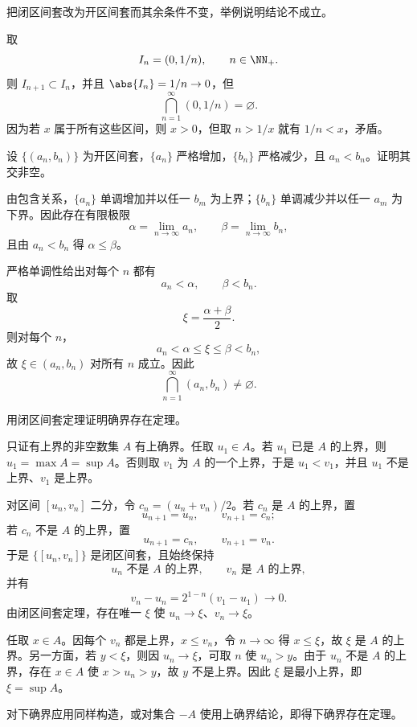 \begin{xexercise}[3.2.3 练习题 2]
把闭区间套改为开区间套而其余条件不变，举例说明结论不成立。
\end{xexercise}
\begin{xsolution}
取
\[
  I_n=(0,1/n),\qquad n\in\NN_+.
\]
则 $I_{n+1}\subset I_n$，并且 $\abs{I_n}=1/n\to0$，但
\[
  \bigcap_{n=1}^{\infty}(0,1/n)=\varnothing.
\]
因为若 $x$ 属于所有这些区间，则 $x>0$，但取 $n>1/x$ 就有 $1/n<x$，矛盾。
\end{xsolution}

\begin{xexercise}[3.2.3 练习题 3]
设 $\{(a_n,b_n)\}$ 为开区间套，$\{a_n\}$ 严格增加，$\{b_n\}$ 严格减少，且 $a_n<b_n$。证明其交非空。
\end{xexercise}
\begin{xsolution}
由包含关系，$\{a_n\}$ 单调增加并以任一 $b_m$ 为上界；$\{b_n\}$ 单调减少并以任一 $a_m$ 为下界。因此存在有限极限
\[
  \alpha=\lim_{n\to\infty}a_n,
  \qquad
  \beta=\lim_{n\to\infty}b_n,
\]
且由 $a_n<b_n$ 得 $\alpha\leqslant\beta$。

严格单调性给出对每个 $n$ 都有
\[
  a_n<\alpha,\qquad \beta<b_n.
\]
取
\[
  \xi=\frac{\alpha+\beta}{2}.
\]
则对每个 $n$，
\[
  a_n<\alpha\leqslant\xi\leqslant\beta<b_n,
\]
故 $\xi\in(a_n,b_n)$ 对所有 $n$ 成立。因此
\[
  \bigcap_{n=1}^{\infty}(a_n,b_n)\neq\varnothing.
\]
\end{xsolution}

\begin{xexercise}[3.2.3 练习题 4]
用闭区间套定理证明确界存在定理。
\end{xexercise}
\begin{xsolution}
只证有上界的非空数集 $A$ 有上确界。任取 $u_1\in A$。若 $u_1$ 已是 $A$ 的上界，则 $u_1=\max A=\sup A$。否则取 $v_1$ 为 $A$ 的一个上界，于是 $u_1<v_1$，并且 $u_1$ 不是上界、$v_1$ 是上界。

对区间 $[u_n,v_n]$ 二分，令 $c_n=(u_n+v_n)/2$。若 $c_n$ 是 $A$ 的上界，置
\[
  u_{n+1}=u_n,\qquad v_{n+1}=c_n;
\]
若 $c_n$ 不是 $A$ 的上界，置
\[
  u_{n+1}=c_n,\qquad v_{n+1}=v_n.
\]
于是 $\{[u_n,v_n]\}$ 是闭区间套，且始终保持
\[
  u_n\text{ 不是 }A\text{ 的上界},\qquad v_n\text{ 是 }A\text{ 的上界},
\]
并有
\[
  v_n-u_n=2^{1-n}(v_1-u_1)\to0.
\]
由闭区间套定理，存在唯一 $\xi$ 使 $u_n\to\xi$、$v_n\to\xi$。

任取 $x\in A$。因每个 $v_n$ 都是上界，$x\leqslant v_n$，令 $n\to\infty$ 得 $x\leqslant\xi$，故 $\xi$ 是 $A$ 的上界。另一方面，若 $y<\xi$，则因 $u_n\to\xi$，可取 $n$ 使 $u_n>y$。由于 $u_n$ 不是 $A$ 的上界，存在 $x\in A$ 使 $x>u_n>y$，故 $y$ 不是上界。因此 $\xi$ 是最小上界，即 $\xi=\sup A$。

对下确界应用同样构造，或对集合 $-A$ 使用上确界结论，即得下确界存在定理。
\end{xsolution}

